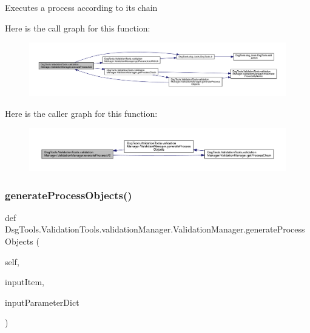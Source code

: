 \begin{DoxyVerb}Executes a process according to its chain
\end{DoxyVerb}
 Here is the call graph for this function\+:
\nopagebreak
\begin{figure}[H]
\begin{center}
\leavevmode
\includegraphics[width=350pt]{class_dsg_tools_1_1_validation_tools_1_1validation_manager_1_1_validation_manager_a2d8658908b9fd7f171aefa0dc4a617a3_cgraph}
\end{center}
\end{figure}
Here is the caller graph for this function\+:
\nopagebreak
\begin{figure}[H]
\begin{center}
\leavevmode
\includegraphics[width=350pt]{class_dsg_tools_1_1_validation_tools_1_1validation_manager_1_1_validation_manager_a2d8658908b9fd7f171aefa0dc4a617a3_icgraph}
\end{center}
\end{figure}
\mbox{\label{class_dsg_tools_1_1_validation_tools_1_1validation_manager_1_1_validation_manager_add0d3a87de62da336d733cf3b1aae3b4}} 
\subsubsection{\texorpdfstring{generate\+Process\+Objects()}{generateProcessObjects()}}
{\footnotesize\ttfamily def Dsg\+Tools.\+Validation\+Tools.\+validation\+Manager.\+Validation\+Manager.\+generate\+Process\+Objects (\begin{DoxyParamCaption}\item[{}]{self,  }\item[{}]{input\+Item,  }\item[{}]{input\+Parameter\+Dict }\end{DoxyParamCaption})}

